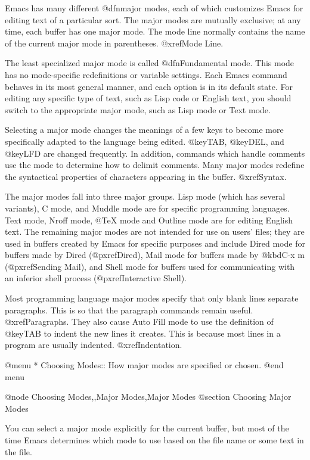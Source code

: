 {{{{{{{{{{{{{{{{{  Emacs has many different @dfn{major modes}, each of which customizes
Emacs for editing text of a particular sort.  The major modes are mutually
exclusive;  at any time, each buffer has one major mode.  The mode line
normally contains the name of the current major mode in parentheses.
@xref{Mode Line}.

  The least specialized major mode is called @dfn{Fundamental mode}.  This
mode has no mode-specific redefinitions or variable settings.  Each
Emacs command behaves in its most general manner, and each option is in its
default state.  For editing any specific type of text, such as Lisp code or
English text, you should switch to the appropriate major mode, such as Lisp
mode or Text mode.

  Selecting a major mode changes the meanings of a few keys to become
more specifically adapted to the language being edited.  @key{TAB},
@key{DEL}, and @key{LFD} are changed frequently.  In addition, commands
which handle comments use the mode to determine how to delimit comments.
Many major modes redefine the syntactical properties of characters
appearing in the buffer.  @xref{Syntax}.

  The major modes fall into three major groups.  Lisp mode (which has
several variants), C mode, and Muddle mode are for specific programming
languages.  Text mode, Nroff mode, @TeX{} mode and Outline mode are for
editing English text.  The remaining major modes are not intended for use
on users' files; they are used in buffers created by Emacs for specific
purposes and include Dired mode for buffers made by Dired (@pxref{Dired}),
Mail mode for buffers made by @kbd{C-x m} (@pxref{Sending Mail}), and Shell
mode for buffers used for communicating with an inferior shell process
(@pxref{Interactive Shell}).

  Most programming language major modes specify that only blank lines
separate paragraphs.  This is so that the paragraph commands remain useful.
@xref{Paragraphs}.  They also cause Auto Fill mode to use the definition of
@key{TAB} to indent the new lines it creates.  This is because most lines
in a program are usually indented.  @xref{Indentation}.

@menu
* Choosing Modes::     How major modes are specified or chosen.
@end menu

@node Choosing Modes,,Major Modes,Major Modes
@section Choosing Major Modes

  You can select a major mode explicitly for the current buffer, but
most of the time Emacs determines which mode to use based on the file
name or some text in the file.

}}}}}}}}}}}}}}}}}

